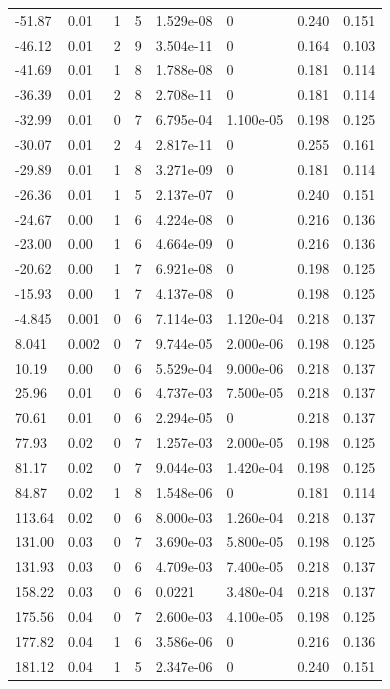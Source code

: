 \documentclass[preview]{standalone}
\begin{document}
{{\begin{tabular}{L{1.2cm}C{1.2cm} C{0.3cm}C{0.5cm} C{1.4cm}C{1.4cm} C{1.4cm}C{1.4cm}}
  -51.87  &  0.01  & 1     &  5 &  1.529e-08  & 0  & 0.240 &  0.151   \\ 
  -46.12  &  0.01  & 2     &  9 &  3.504e-11  & 0  & 0.164 &  0.103   \\ 
  -41.69  &  0.01  & 1     &  8 &  1.788e-08  & 0  & 0.181 &  0.114   \\ 
  -36.39  &  0.01  & 2     &  8 &  2.708e-11  & 0  & 0.181 &  0.114   \\ 
  -32.99  &  0.01  & 0     &  7 &  6.795e-04  & 1.100e-05  & 0.198 &  0.125   \\ 
  -30.07  &  0.01  & 2     &  4 &  2.817e-11  & 0  & 0.255 &  0.161   \\ 
  -29.89  &  0.01  & 1     &  8 &  3.271e-09  & 0  & 0.181 &  0.114   \\ 
  -26.36  &  0.01  & 1     &  5 &  2.137e-07  & 0  & 0.240 &  0.151   \\ 
  -24.67  &  0.00  & 1     &  6 &  4.224e-08  & 0  & 0.216 &  0.136   \\ 
  -23.00  &  0.00  & 1     &  6 &  4.664e-09  & 0  & 0.216 &  0.136   \\ 
  -20.62  &  0.00  & 1     &  7 &  6.921e-08  & 0  & 0.198 &  0.125   \\ 
  -15.93  &  0.00  & 1     &  7 &  4.137e-08  & 0  & 0.198 &  0.125   \\ 
  -4.845  &  0.001  & 0     &  6 &  7.114e-03  & 1.120e-04  & 0.218 &  0.137   \\ 
  8.041  &  0.002  & 0     &  7 &  9.744e-05  & 2.000e-06  & 0.198 &  0.125   \\ 
  10.19  &  0.00  & 0     &  6 &  5.529e-04  & 9.000e-06  & 0.218 &  0.137   \\ 
  25.96  &  0.01  & 0     &  6 &  4.737e-03  & 7.500e-05  & 0.218 &  0.137   \\ 
  70.61  &  0.01  & 0     &  6 &  2.294e-05  & 0  & 0.218 &  0.137   \\ 
  77.93  &  0.02  & 0     &  7 &  1.257e-03  & 2.000e-05  & 0.198 &  0.125   \\ 
  81.17  &  0.02  & 0     &  7 &  9.044e-03  & 1.420e-04  & 0.198 &  0.125   \\ 
  84.87  &  0.02  & 1     &  8 &  1.548e-06  & 0  & 0.181 &  0.114   \\ 
  113.64  &  0.02  & 0     &  6 &  8.000e-03  & 1.260e-04  & 0.218 &  0.137   \\ 
  131.00  &  0.03  & 0     &  7 &  3.690e-03  & 5.800e-05  & 0.198 &  0.125   \\ 
  131.93  &  0.03  & 0     &  6 &  4.709e-03  & 7.400e-05  & 0.218 &  0.137   \\ 
  158.22  &  0.03  & 0     &  6 &  0.0221  & 3.480e-04  & 0.218 &  0.137   \\ 
  175.56  &  0.04  & 0     &  7 &  2.600e-03  & 4.100e-05  & 0.198 &  0.125   \\ 
  177.82  &  0.04  & 1     &  6 &  3.586e-06  & 0  & 0.216 &  0.136   \\ 
  181.12  &  0.04  & 1     &  5 &  2.347e-06  & 0  & 0.240 &  0.151   \\ 
\hline 
\end{tabular} 

}}
\end{document}
